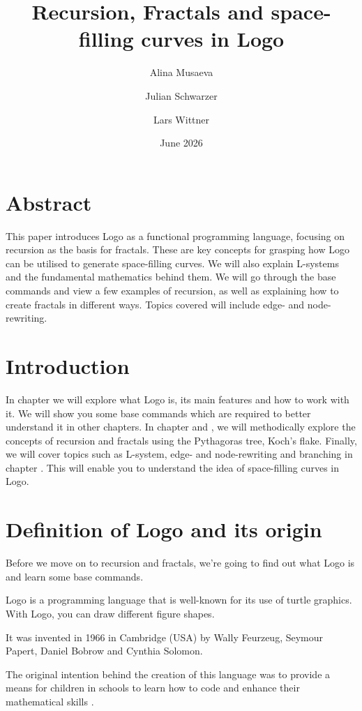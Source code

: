 \documentclass[a4paper, 11pt]{article}
\title{Recursion, Fractals and space-filling curves in Logo}
\author{Alina Musaeva \and Julian Schwarzer \and Lars Wittner}
\date{June 2026}
\begin{document}
\maketitle

\section*{Abstract}
This paper introduces Logo as a functional programming language, focusing on recursion as the basis for fractals. These are key concepts for grasping how Logo can be utilised to generate space-filling curves. We will also explain L-systems and the fundamental mathematics behind them. We will go through the base commands and view a few examples of recursion, as well as explaining how to create fractals in different ways. Topics covered will include edge- and node-rewriting.

\section{Introduction}

In chapter  we will explore what Logo is, its main features and how to work with it. We will show you some base commands which are required to better understand it in other chapters. In chapter  and  , we will methodically explore the concepts of recursion and fractals using the Pythagoras tree, Koch's flake. Finally, we will cover topics such as L-system, edge- and node-rewriting and branching in chapter . This will enable you to understand the idea of space-filling curves in Logo.

\section{Definition of Logo and its origin}
\label{sec:definitionlog}
Before we move on to recursion and fractals, we're going to find out what Logo is and learn some base commands.

Logo is a programming language that is well-known for its use of turtle graphics. With Logo, you can draw different figure shapes.

It was invented in 1966 in Cambridge (USA) by Wally Feurzeug, Seymour Papert, Daniel Bobrow and Cynthia Solomon.

The original intention behind the creation of this language was to provide a means for children in schools to learn how to code and enhance their mathematical skills \cite{history}.
\end{document}
